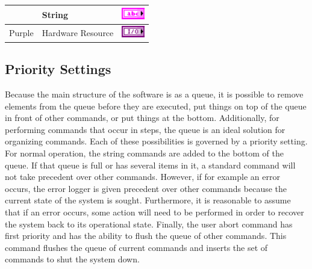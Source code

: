 \begin{table}[h]
\begin{tabular}{clc}
		& String								& \includegraphics[height=0.2in]{Figures/ColorCoding_String.pdf}				\\\hline
Purple	& Hardware Resource					& \includegraphics[height=0.2in]{Figures/ColorCoding_HardwareReference.pdf}	\\\hline
\end{tabular}\label{Tab:BPColorCoding}\end{table}











\subsection{Priority Settings}
Because the main structure of the software is as a queue, it is possible to remove elements from the queue before they are executed, put things on top of the queue in front of other commands, or put things at the bottom. Additionally, for performing commands that occur in steps, the queue is an ideal solution for organizing commands. Each of these possibilities is governed by a priority setting. For normal operation, the string commands are added to the bottom of the queue. If that queue is full or has several items in it, a standard command will not take precedent over other commands. However, if for example an error occurs, the error logger is given precedent over other commands because the current state of the system is sought. Furthermore, it is reasonable to assume that if an error occurs, some action will need to be performed in order to recover the system back to its operational state.  Finally, the user abort command has first priority and has the ability to flush the queue of other commands. This command flushes the queue of current commands and inserts the set of commands to shut the system down.


